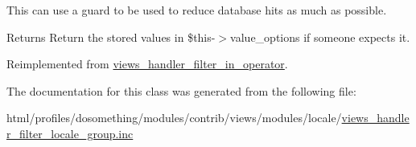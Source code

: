 This can use a guard to be used to reduce database hits as much as possible.

\begin{DoxyReturn}{Returns}
Return the stored values in \$this-\/$>$value\_\-options if someone expects it. 
\end{DoxyReturn}


Reimplemented from \hyperlink{classviews__handler__filter__in__operator_aa5b5df6d90f4359ed28c0c446bdc81a6}{views\_\-handler\_\-filter\_\-in\_\-operator}.

The documentation for this class was generated from the following file:\begin{DoxyCompactItemize}
\item 
html/profiles/dosomething/modules/contrib/views/modules/locale/\hyperlink{views__handler__filter__locale__group_8inc}{views\_\-handler\_\-filter\_\-locale\_\-group.inc}\end{DoxyCompactItemize}
